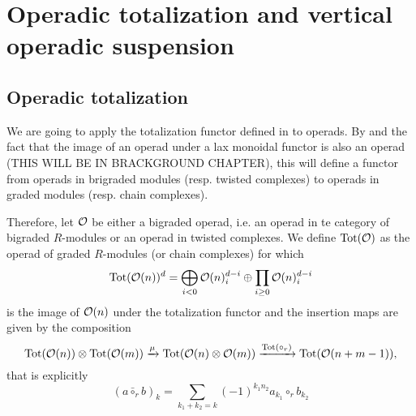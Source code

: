 \documentclass[join.tex]{subfiles}
\begin{document}
\section{Operadic totalization and vertical operadic suspension}\label{operadic}
\subsection{Operadic totalization}


We are going to apply the totalization  functor defined in  to operads. By  and the fact that the image of an operad under a lax monoidal functor is also an operad (THIS WILL BE IN BRACKGROUND CHAPTER), this will define a functor from operads in brigraded modules (resp. twisted complexes) to operads in graded modules (resp. chain complexes). %

Therefore, let ${\mathcal O}$ be either a bigraded operad, i.e. an operad in te category of bigraded $R$-modules or an operad in twisted complexes. We define $\mathrm{Tot}({\mathcal O})$ as the operad of graded $R$-modules (or chain complexes) for which \[\mathrm{Tot}({\mathcal O}(n))^d=\bigoplus_{i<0}{\mathcal O}(n)^{d-i}_i\oplus\prod_{i\geq 0} {\mathcal O}(n)^{d-i}_i\] is the image of ${\mathcal O}(n)$ under the totalization functor and the insertion maps are given by the composition  %
\begin{equation}\label{insertion}
\mathrm{Tot}({\mathcal O}(n))\otimes \mathrm{Tot}({\mathcal O}(m))\xrightarrow{\mu} \mathrm{Tot}({\mathcal O}(n)\otimes {\mathcal O}(m)) \xrightarrow{\mathrm{Tot}(\circ_r)} \mathrm{Tot}({\mathcal O}(n+m-1)),
\end{equation}
that is explicitly 
\[(a\bar{\circ}_rb)_k=\sum_{k_1+k_2=k} (-1)^{k_1n_2} a_{k_1}\circ_r b_{k_2}\]
\end{document}
